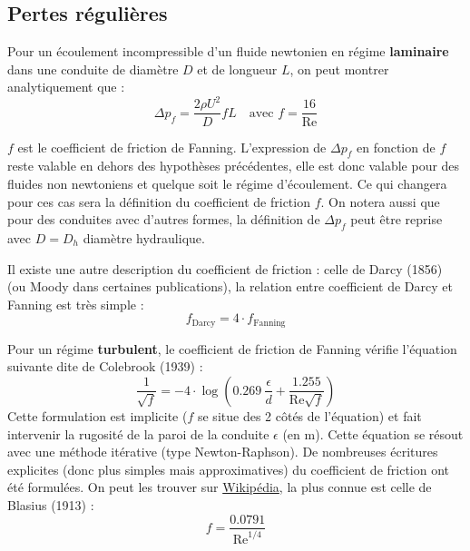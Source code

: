 \subsection{Pertes régulières}
%
\begin{center}
\end{center}
%
Pour un écoulement incompressible d'un fluide newtonien en régime \textbf{laminaire} dans une conduite de diamètre $D$ et de longueur $L$, on peut montrer analytiquement que :
%
\begin{equation}
    \Delta p_f = \frac{2\rho U^2}{D} f L
    \quad\text{avec } f = \frac{16}{\mathrm{Re}}
\end{equation}

$f$ est le coefficient de friction de Fanning. L'expression de $\Delta p_f$ en fonction de $f$ reste valable en dehors des hypothèses précédentes, elle est donc valable pour des fluides non newtoniens et quelque soit le régime d'écoulement. Ce qui changera pour ces cas sera la définition du coefficient de friction $f$. On notera aussi que pour des conduites avec d'autres formes, la définition de $\Delta p_f$ peut être reprise avec $D = D_h$ diamètre hydraulique.

Il existe une autre description du coefficient de friction : celle de Darcy (1856) (ou Moody dans certaines publications), la relation entre coefficient de Darcy et Fanning est très simple :
%
\begin{equation}
    f_{\text{Darcy}} = 4\cdot f_{\text{Fanning}}
\end{equation}

Pour un régime \textbf{turbulent}, le coefficient de friction de Fanning vérifie l'équation suivante dite de Colebrook (1939) :
%
\begin{equation}
    \frac{1}{\sqrt{f}} = -4\cdot\log\left(\num{0.269}~\frac{\epsilon}{d} + \frac{\num{1.255}}{\mathrm{Re}\sqrt{f}}\right)
\end{equation}
%
Cette formulation est implicite ($f$ se situe des 2 côtés de l'équation) et fait intervenir la rugosité de la paroi de la conduite $\epsilon$ (en \si{\meter}). Cette équation se résout avec une méthode itérative (type Newton-Raphson). De nombreuses écritures explicites (donc plus simples mais approximatives) du coefficient de friction ont été formulées. On peut les trouver sur \href{https://en.wikipedia.org/wiki/Darcy_friction_factor_formulae}{Wikipédia}, la plus connue est celle de Blasius (1913) :
%
\begin{equation}
    f = \frac{\num{0.0791}}{\mathrm{Re}^{1/4}}
\end{equation}


